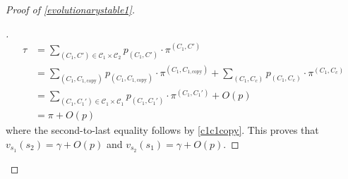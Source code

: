\documentclass[11pt]{amsart}
\theoremstyle{definition}
\theoremstyle{remark}
\newenvironment{subproof}[1][\proofname]{%
  \renewcommand{\qedsymbol}{$\blacksquare$}%
  \begin{proof}[#1]%
}{%
  \end{proof}%
}
\begin{document}
\begin{proof}[Proof of \cref{evolutionarystable1}]
\begin{subproof}


        \begin{align*}
          \tau &= \sum_{(C_1, C') \in \mathcal{C}_1 \times \mathcal{C}_2} p_{(C_1, C')} \cdot \pi^{(C_1, C')} \\
          &= \sum_{(C_1, C_{1, \text{copy}})} p_{(C_1, C_{1, \text{copy}})} \cdot \pi^{(C_1, C_{1, \text{copy}})} + \sum_{(C_1, C_c)} p_{(C_1, C_c)} \cdot \pi^{(C_1, C_c)} \\
          &= \sum_{(C_1, C_1') \in \mathcal{C}_1 \times \mathcal{C}_1} p_{(C_1, C_1')} \cdot \pi^{(C_1, C_1')} + O(p) \\
          &= \pi + O(p)
        \end{align*}
        where the second-to-last equality follows by \cref{c1c1copy}.  This proves that $v_{s_1}(s_2) = \gamma + O(p)$ and $v_{s_2}(s_1) = \gamma + O(p)$.


\end{subproof}
\end{proof}
\end{document}
